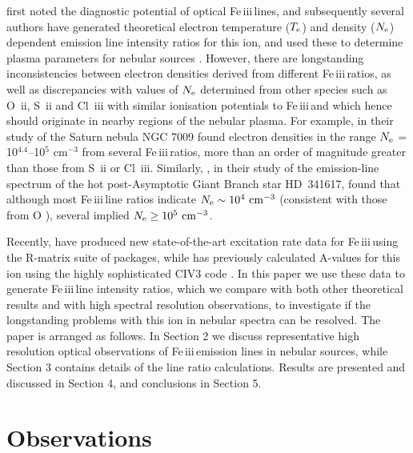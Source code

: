\documentclass{emulateapj}
\def\unit #1{\,{\rm #1}}
\newcommand\cmcubei{\rm \,\unit{cm^{-3}}}
\newcommand\fe{Fe\,{\sc iii}\,}
\begin{document}
\citet{1978ApJ...222..384G} first noted the diagnostic potential of optical \fe lines, and subsequently several authors have generated theoretical electron temperature ($T_{\rm e}$) and density ($N_{\rm e}$) dependent emission line intensity ratios for this ion, and used these to 
determine plasma parameters for nebular sources \citep[for example,][and references therein.]{1993ApJ...410..430K,2001PNAS...98.9476K,2010ApJ...718L.189B}. However, there are longstanding inconsistencies between electron densities derived from 
different \fe ratios, as well as discrepancies with values of $N_{\rm e}$ determined from other species such as {O~{\sc ii}}, {S~{\sc ii}} and {Cl~{\sc iii}} with similar ionisation potentials to \fe and which hence should originate in nearby regions of the nebular plasma. For example, \citet{2011MNRAS.415..181F} in their study of the Saturn nebula NGC 7009 found electron densities in the range
$N_{\rm e}$ = 10$^{4.4}$--10$^{5}$ cm$^{-3}$ from 
several \fe ratios, more than an order of magnitude greater than those from {S~{\sc ii}} or {Cl~{\sc iii}}. Similarly, \citet{2003A&A...401.1119R}, in their study of the emission-line spectrum of the hot post-Asymptotic Giant Branch star HD~341617,
found that although most \fe line ratios indicate $N_{\rm e} \sim 10^4 \cmcubei$ (consistent with those from {O }), 
several implied $N_{\rm e} \ge 10^5 \cmcubei$. 

Recently, \citet{2014ApJ...785...99B} have produced new state-of-the-art excitation rate data for \fe using the R-matrix
suite of packages, while \citet{2009ADNDT..95..184D} has previously calculated A-values for this ion using the highly sophisticated
CIV3 code \citep{1975CoPhC...9..141H,1991CoPhC..64..455H}. In this paper we use these data to generate \fe line intensity ratios, which we compare with both other theoretical results and with high spectral resolution observations, to investigate if the longstanding problems with this ion in nebular spectra 
can be resolved. The paper is arranged as follows. In Section 2 we discuss representative 
high resolution optical observations of \fe emission lines in nebular sources, while 
Section 3 contains details of the line ratio calculations. Results are presented and discussed in 
Section 4, and conclusions in Section 5. 






\section{Observations}\label{subsec:obs}
\end{document}
